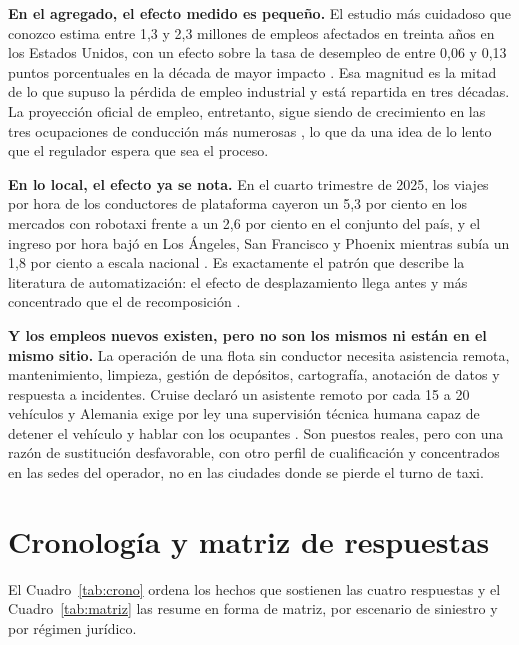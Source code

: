 \documentclass[11pt,letterpaper]{article}
\begin{document}
\textbf{En el agregado, el efecto medido es pequeño.} El estudio más cuidadoso
que conozco estima entre 1,3 y 2,3 millones de empleos afectados en treinta años
en los Estados Unidos, con un efecto sobre la tasa de desempleo de entre 0,06 y
0,13 puntos porcentuales en la década de mayor impacto \parencite{groshen2018}.
Esa magnitud es la mitad de lo que supuso la pérdida de empleo industrial y está
repartida en tres décadas. La proyección oficial de empleo, entretanto, sigue
siendo de crecimiento en las tres ocupaciones de conducción más numerosas
\parencite{bls2026camion,bls2026taxi}, lo que da una idea de lo lento que el
regulador espera que sea el proceso.

\textbf{En lo local, el efecto ya se nota.} En el cuarto trimestre de 2025, los
viajes por hora de los conductores de plataforma cayeron un 5,3 por ciento en los
mercados con robotaxi frente a un 2,6 por ciento en el conjunto del país, y el
ingreso por hora bajó en Los Ángeles, San Francisco y Phoenix mientras subía un
1,8 por ciento a escala nacional \parencite{gridwise2026}. Es exactamente el
patrón que describe la literatura de automatización: el efecto de
desplazamiento llega antes y más concentrado que el de recomposición
\parencite{acemoglu2020,autor2015}.

\textbf{Y los empleos nuevos existen, pero no son los mismos ni están en el
mismo sitio.} La operación de una flota sin conductor necesita asistencia remota,
mantenimiento, limpieza, gestión de depósitos, cartografía, anotación de datos y
respuesta a incidentes. Cruise declaró un asistente remoto por cada 15 a 20
vehículos \parencite{cnbc2023cruise} y Alemania exige por ley una supervisión
técnica humana capaz de detener el vehículo y hablar con los ocupantes
\parencite{hoganlovells2021,taylorwessing2026}. Son puestos reales, pero con una
razón de sustitución desfavorable, con otro perfil de cualificación y
concentrados en las sedes del operador, no en las ciudades donde se pierde el
turno de taxi.

\section{Cronología y matriz de respuestas}

El Cuadro~\ref{tab:crono} ordena los hechos que sostienen las cuatro
respuestas y el Cuadro~\ref{tab:matriz} las resume en forma de matriz, por
escenario de siniestro y por régimen jurídico.
\end{document}

